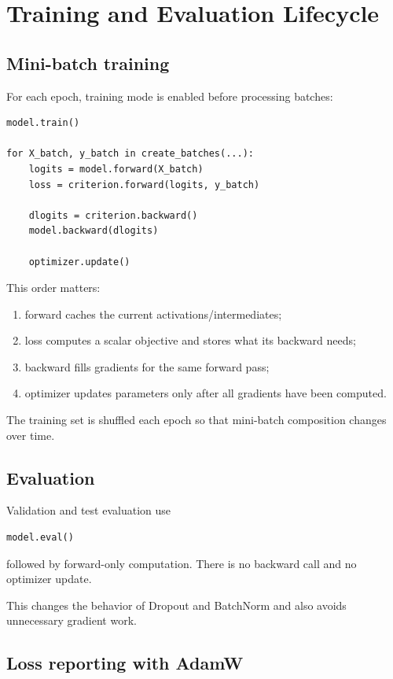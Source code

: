 \documentclass[11pt,a4paper]{article}
\begin{document}
\section{Training and Evaluation Lifecycle}

\subsection{Mini-batch training}

For each epoch, training mode is enabled before processing batches:
\begin{lstlisting}
model.train()

for X_batch, y_batch in create_batches(...):
    logits = model.forward(X_batch)
    loss = criterion.forward(logits, y_batch)

    dlogits = criterion.backward()
    model.backward(dlogits)

    optimizer.update()
\end{lstlisting}

This order matters:
\begin{enumerate}[leftmargin=2em]
    \item forward caches the current activations/intermediates;
    \item loss computes a scalar objective and stores what its backward needs;
    \item backward fills gradients for the same forward pass;
    \item optimizer updates parameters only after all gradients have been computed.
\end{enumerate}

The training set is shuffled each epoch so that mini-batch composition changes over time.

\subsection{Evaluation}

Validation and test evaluation use
\begin{lstlisting}
model.eval()
\end{lstlisting}
followed by forward-only computation. There is no backward call and no optimizer update.

This changes the behavior of Dropout and BatchNorm and also avoids unnecessary gradient work.

\subsection{Loss reporting with AdamW}
\end{document}
